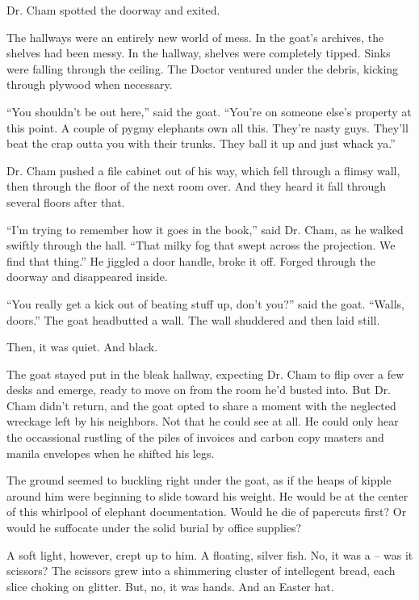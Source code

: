 \documentclass[12pt,twoside]{report}
\begin{document}
Dr. Cham spotted the doorway and exited.

The hallways were an entirely new world of mess.  In the goat's
archives, the shelves had been messy. In the hallway, shelves were
completely tipped.  Sinks were falling through the ceiling.  The
Doctor ventured under the debris, kicking through plywood when
necessary.

``You shouldn't be out here,'' said the goat.  ``You're on someone
else's property at this point. A couple of pygmy elephants own all
this.  They're nasty guys.  They'll beat the crap outta you with their
trunks.  They ball it up and just whack ya.''

Dr. Cham pushed a file cabinet out of his way, which fell through a
flimsy wall, then through the floor of the next room over.  And they
heard it fall through several floors after that.

``I'm trying to remember how it goes in the book,'' said Dr. Cham, as
he walked swiftly through the hall.  ``That milky fog that swept
across the projection.  We find that thing.''  He jiggled a door
handle, broke it off.  Forged through the doorway and disappeared
inside.

``You really get a kick out of beating stuff up, don't you?'' said the
goat.  ``Walls, doors.'' The goat headbutted a wall.  The wall
shuddered and then laid still.

Then, it was quiet.  And black.

The goat stayed put in the bleak hallway, expecting Dr. Cham to flip
over a few desks and emerge, ready to move on from the room he'd
busted into.  But Dr. Cham didn't return, and the goat opted to share
a moment with the neglected wreckage left by his neighbors.  Not that
he could see at all. He could only hear the occassional rustling of
the piles of invoices and carbon copy masters and manila envelopes
when he shifted his legs.

The ground seemed to buckling right under the goat, as if the heaps of
kipple around him were beginning to slide toward his weight.  He would
be at the center of this whirlpool of elephant documentation.  Would
he die of papercuts first?  Or would he suffocate under the solid
burial by office supplies?

A soft light, however, crept up to him.  A floating, silver fish.  No,
it was a -- was it scissors? The scissors grew into a shimmering
cluster of intellegent bread, each slice choking on glitter. But, no,
it was hands.  And an Easter hat.
\end{document}
